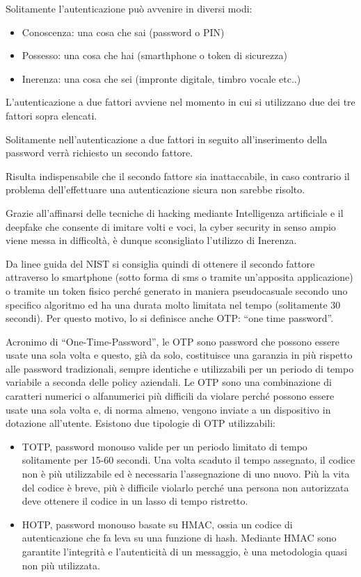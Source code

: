 Solitamente l’autenticazione può avvenire in diversi modi: 
\begin{itemize}
    \item Conoscenza: una cosa che sai (password o PIN)
    \item Possesso: una cosa che hai (smarthphone o token di sicurezza)
    \item Inerenza: una cosa che sei (impronte digitale, timbro vocale etc..)
\end{itemize}
L’autenticazione a due fattori avviene nel momento in cui si utilizzano due dei tre fattori sopra elencati. 

Solitamente nell’autenticazione a due fattori in seguito all’inserimento della password verrà richiesto un secondo fattore. 

Risulta indispensabile che il secondo fattore sia inattaccabile, in caso contrario il problema dell’effettuare una autenticazione sicura non sarebbe risolto. 

Grazie all’affinarsi delle tecniche di hacking mediante Intelligenza artificiale e il deepfake che consente di imitare volti e voci, la cyber security in senso ampio viene messa in difficoltà, è dunque sconsigliato l’utilizzo di Inerenza.

Da linee guida del NIST si consiglia quindi di ottenere il  secondo fattore attraverso lo smartphone (sotto forma di sms o tramite un’apposita applicazione) o tramite un token fisico perché generato in maniera pseudocasuale secondo uno specifico algoritmo ed ha una durata molto limitata nel tempo (solitamente 30 secondi).  Per questo motivo, lo si definisce anche OTP: “one time password”.

Acronimo di “One-Time-Password”, le OTP sono password che possono essere usate una sola volta e questo, già da solo, costituisce una garanzia in più rispetto alle password tradizionali, sempre identiche e utilizzabili per un periodo di tempo variabile a seconda delle policy aziendali. Le OTP sono una combinazione di caratteri numerici o alfanumerici più difficili da violare perché possono essere usate una sola volta e, di norma almeno, vengono inviate a un dispositivo in dotazione all’utente.
Esistono due tipologie di OTP utilizzabili:
\begin{itemize}
    \item TOTP, password monouso valide per un periodo limitato di tempo solitamente per 15-60 secondi. Una volta scaduto il tempo assegnato, il codice non è più utilizzabile ed è necessaria l’assegnazione di uno nuovo. Più la vita del codice è breve, più è difficile violarlo perché una persona non autorizzata deve ottenere il codice in un lasso di tempo ristretto.  
    \item HOTP, password monouso basate su HMAC, ossia un codice di autenticazione che fa leva su una funzione di hash. Mediante HMAC sono garantite l’integrità e l’autenticità di un messaggio, è una metodologia quasi non più utilizzata. 
\end{itemize}

